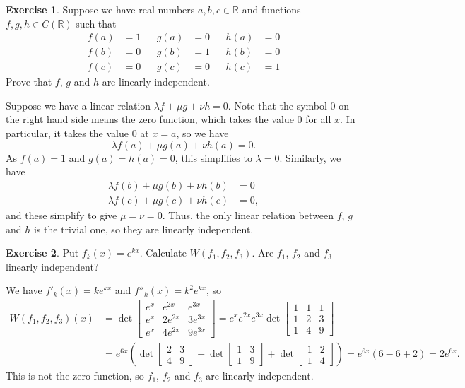 \documentclass{amsart}
\newcommand{\R}         {{\mathbb{R}}}
\newcommand{\bbm}       {\left[\begin{matrix}}
\newcommand{\ebm}       {\end{matrix}\right]}
\newcommand{\lm}        {\lambda}
\renewcommand{\:}       {\colon}
\theoremstyle{definition}
\newtheorem{exercise}{Exercise}[section]
\renewenvironment{solution}{\SolutionAtEnd}{\endSolutionAtEnd}
\begin{document}
\begin{exercise}
 Suppose we have real numbers $a,b,c\in\R$ and functions
 $f,g,h\in C(\R)$ such that 
 \begin{align*}
  f(a) &= 1 && g(a) &= 0 && h(a) &= 0 \\
  f(b) &= 0 && g(b) &= 1 && h(b) &= 0 \\
  f(c) &= 0 && g(c) &= 0 && h(c) &= 1
 \end{align*}
 Prove that $f$, $g$ and $h$ are linearly independent.
\end{exercise}
\begin{solution}
 Suppose we have a linear relation $\lm f+\mu g+\nu h=0$.
 Note that the symbol $0$ on the right hand side means the
 zero function, which takes the value $0$ for all $x$.  In
 particular, it takes the value $0$ at $x=a$, so we have
 \[ \lm f(a) + \mu g(a) + \nu h(a) = 0. \]
 As $f(a)=1$ and $g(a)=h(a)=0$, this simplifies to $\lm=0$.
 Similarly, we have
 \begin{align*}
  \lm f(b) + \mu g(b) + \nu h(b) &= 0 \\
  \lm f(c) + \mu g(c) + \nu h(c) &= 0,
 \end{align*}
 and these simplify to give $\mu=\nu=0$.  Thus, the only
 linear relation between $f$, $g$ and $h$ is the trivial
 one, so they are linearly independent.
\end{solution}

\begin{exercise}
 Put $f_k(x)=e^{kx}$.  Calculate $W(f_1,f_2,f_3)$.  Are
 $f_1$, $f_2$ and $f_3$ linearly independent?
\end{exercise}
\begin{solution}
 We have $f'_k(x)=ke^{kx}$ and $f''_k(x)=k^2e^{kx}$, so
 \begin{align*}
  W(f_1,f_2,f_3)(x)
   &= \det\bbm e^x &   e^{2x} &   e^{3x} \\
               e^x & 2 e^{2x} & 3 e^{3x} \\
               e^x & 4 e^{2x} & 9 e^{3x} \ebm  
    = e^x e^{2x} e^{3x} \det \bbm 1&1&1 \\ 1&2&3 \\ 1&4&9 \ebm \\
   &= e^{6x}\left(
         \det\bbm 2&3\\4&9 \ebm 
       - \det\bbm 1&3\\1&9 \ebm
       + \det\bbm 1&2\\1&4 \ebm 
      \right) 
    = e^{6x} (6 - 6 + 2) = 2 e^{6x}.
 \end{align*}
 This is not the zero function, so $f_1$, $f_2$ and $f_3$
 are linearly independent.
\end{solution}
\end{document}
